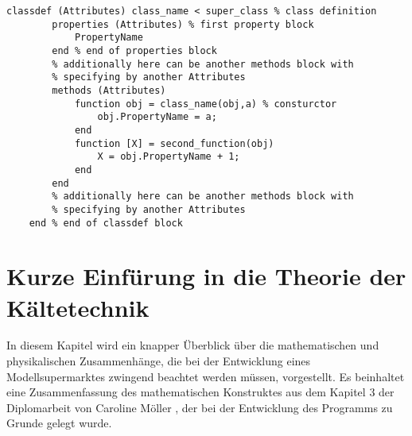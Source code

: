 
\begin{lstlisting}[float=h,frame=none]
	classdef (Attributes) class_name < super_class % class definition
		properties (Attributes) % first property block
			PropertyName
		end % end of properties block
		% additionally here can be another methods block with 
		% specifying by another Attributes
		methods (Attributes) 
			function obj = class_name(obj,a) % consturctor
				obj.PropertyName = a;
			end
			function [X] = second_function(obj)
				X = obj.PropertyName + 1;
			end
		end
		% additionally here can be another methods block with 
		% specifying by another Attributes
	end % end of classdef block
\end{lstlisting}

\section{Kurze Einf\"urung in die Theorie der K\"altetechnik}

In diesem Kapitel wird ein knapper \"Uberblick über die mathematischen und
physikalischen Zusammenhänge, die bei der Entwicklung eines Modellsupermarktes
zwingend beachtet werden müssen, vorgestellt. Es beinhaltet eine Zusammenfassung des mathematischen Konstruktes aus dem
Kapitel 3 der Diplomarbeit von Caroline Möller \cite{caro}, der bei der
Entwicklung des Programms zu Grunde gelegt wurde.


